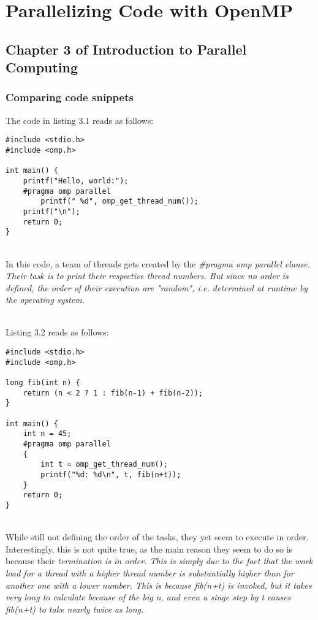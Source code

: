 \documentclass[../../main.tex]{subfiles}
\begin{document}
\section{Parallelizing Code with OpenMP}
\subsection{Chapter 3 of Introduction to Parallel Computing}
\subsubsection{Comparing code snippets}
The code in listing 3.1 reads as follows:

\begin{lstlisting}
#include <stdio.h>
#include <omp.h>

int main() {
    printf("Hello, world:");
    #pragma omp parallel
        printf(" %d", omp_get_thread_num());
    printf("\n");
    return 0;
}
\end{lstlisting}

~\\
In this code, a team of threads gets created by the \em \#pragma omp parallel \em clause.
Their task is to print their respective thread numbers.
But since no order is defined, the order of their execution are "random", i.e. determined at runtime by the operating system.

~\\
Listing 3.2 reads as follows:

\begin{lstlisting}
#include <stdio.h>
#include <omp.h>

long fib(int n) {
    return (n < 2 ? 1 : fib(n-1) + fib(n-2));
}

int main() {
    int n = 45;
    #pragma omp parallel
    {
        int t = omp_get_thread_num();
        printf("%d: %d\n", t, fib(n+t));
    }
    return 0;
}
\end{lstlisting}

~\\
While still not defining the order of the tasks, they yet seem to execute in order.
Interestingly, this is not quite true, as the main reason they seem to do so is because their \em termination \em is in order.
This is simply due to the fact that the work load for a thread with a higher thread number is substantially higher than for another one with a lower number.
This is because fib(n+t) is invoked, but it takes very long to calculate because of the big n, and even a singe step by t causes fib(n+t) to take nearly twice as long.
\end{document}
